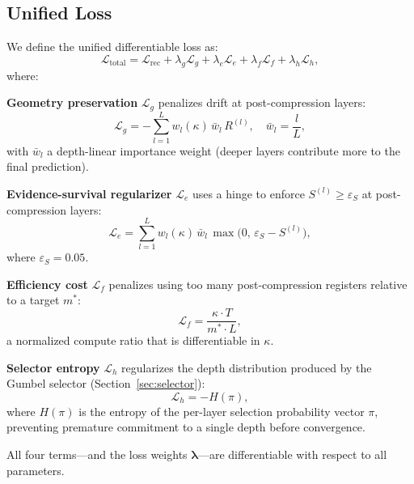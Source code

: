 \documentclass[lettersize,journal]{IEEEtran}
\newcommand{\calL}{\mathcal{L}}
\newcommand{\lambdavec}{\boldsymbol{\lambda}}
\begin{document}
\subsection{Unified Loss}

We define the unified differentiable loss as:
\begin{equation}
  \calL_{\text{total}} = \calL_{\text{rec}}
    + \lambda_g \calL_g
    + \lambda_e \calL_e
    + \lambda_f \calL_f
    + \lambda_h \calL_h,
  \label{eq:unified}
\end{equation}
where:

\noindent
\textbf{Geometry preservation} $\calL_g$ penalizes drift at
post-compression layers:
\begin{equation}
  \calL_g = -\sum_{l=1}^L w_l(\kappa)\, \bar{w}_l\, R^{(l)},
  \quad \bar{w}_l = \frac{l}{L},
  \label{eq:Lg}
\end{equation}
with $\bar{w}_l$ a depth-linear importance weight
(deeper layers contribute more to the final prediction).

\noindent
\textbf{Evidence-survival regularizer} $\calL_e$ uses a hinge
to enforce $S^{(l)} \geq \varepsilon_S$ at post-compression layers:
\begin{equation}
  \calL_e = \sum_{l=1}^L w_l(\kappa)\, \bar{w}_l\,
            \max\!\bigl(0,\, \varepsilon_S - S^{(l)}\bigr),
  \label{eq:Le}
\end{equation}
where $\varepsilon_S = 0.05$.

\noindent
\textbf{Efficiency cost} $\calL_f$ penalizes using too many
post-compression registers relative to a target $m^*$:
\begin{equation}
  \calL_f = \frac{\kappa \cdot T}{m^* \cdot L},
  \label{eq:Lf}
\end{equation}
a normalized compute ratio that is differentiable in $\kappa$.

\noindent
\textbf{Selector entropy} $\calL_h$ regularizes the depth
distribution produced by the Gumbel selector
(Section~\ref{sec:selector}):
\begin{equation}
  \calL_h = -H\!\left(\pi\right),
  \label{eq:Lh}
\end{equation}
where $H(\pi)$ is the entropy of the per-layer selection
probability vector $\pi$, preventing premature commitment to a
single depth before convergence.

\noindent
All four terms---and the loss weights $\lambdavec$---are
differentiable with respect to all parameters.


\end{document}
